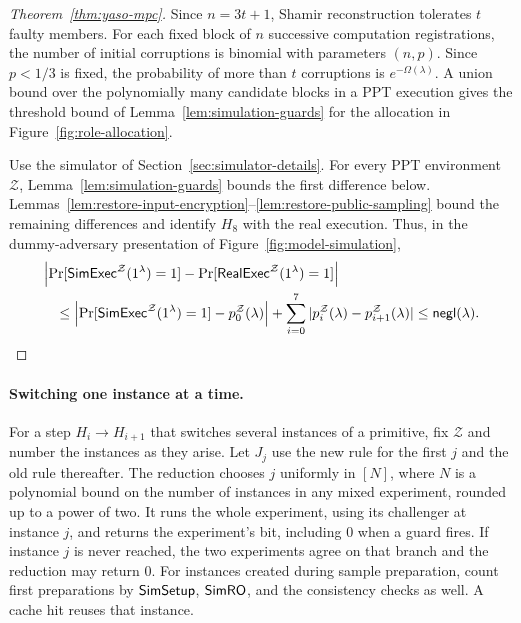 \begin{proof}[Theorem~\ref{thm:yaso-mpc}]
Since $n=3t+1$, Shamir reconstruction tolerates $t$ faulty members.
For each fixed block of $n$ successive
computation registrations, the number of initial corruptions is
binomial with parameters $(n,p)$. Since $p<1/3$ is fixed, the probability
of more than $t$ corruptions is $e^{-\Omega(\lambda)}$. A union bound
over the polynomially many candidate blocks in a PPT execution gives
the threshold bound of Lemma~\ref{lem:simulation-guards} for the
allocation in Figure~\ref{fig:role-allocation}.

Use the simulator of Section~\ref{sec:simulator-details}. For every PPT
environment $\mathcal Z$, Lemma~\ref{lem:simulation-guards} bounds the
first difference below. Lemmas~\ref{lem:restore-input-encryption}--\ref{lem:restore-public-sampling}
bound the remaining differences and identify $H_8$ with the real execution.
Thus, in the dummy-adversary presentation of Figure~\ref{fig:model-simulation},
\[
\begin{split}
 &\left|\Pr[\mathsf{SimExec}^{\mathcal Z}(1^\lambda)=1]
       -\Pr[\mathsf{RealExec}^{\mathcal Z}(1^\lambda)=1]\right|\\
 &\quad\leq
 \left|\Pr[\mathsf{SimExec}^{\mathcal Z}(1^\lambda)=1]-p_0^{\mathcal Z}(\lambda)\right|
 +\sum_{i=0}^{7}|p_i^{\mathcal Z}(\lambda)-p_{i+1}^{\mathcal Z}(\lambda)|
 \leq \mathop{\mathsf{negl}}(\lambda).
\end{split}
\]
\end{proof}

\paragraph{Switching one instance at a time.}
For a step $H_i\to H_{i+1}$ that switches several instances of a
primitive, fix $\mathcal Z$ and number the instances as they arise.
Let $J_j$ use the new rule for the first $j$ and the old rule thereafter.
The reduction chooses $j$ uniformly in $[N]$, where $N$ is a polynomial
bound on the number of instances in any mixed experiment, rounded up to
a power of two.  It runs the whole experiment, using its challenger at
instance $j$, and returns the experiment's bit, including $0$ when a
guard fires.  If instance $j$ is never reached, the two experiments
agree on that branch and the reduction may return $0$.  For instances
created during sample preparation, count first preparations by $\mathsf{SimSetup}$, $\mathsf{SimRO}$, and the
consistency checks as well.  A cache hit reuses that instance.

